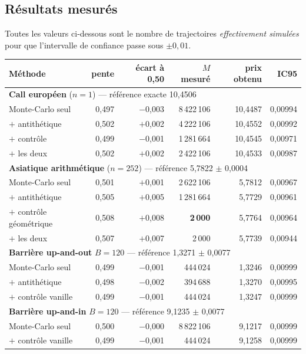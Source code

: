 \documentclass[11pt,a4paper]{article}
\begin{document}
\subsection{Résultats mesurés}

Toutes les valeurs ci-dessous sont le nombre de trajectoires \emph{effectivement
simulées} pour que l'intervalle de confiance passe sous $\pm 0{,}01$.

\begin{center}
\small
\begin{tabular}{lrrrrr}
\toprule
Méthode & pente & écart à 0,50 & $M$ mesuré & prix obtenu & IC95 \\
\midrule
\multicolumn{6}{l}{\textbf{Call européen} ($n = 1$) --- référence exacte 10,4506}\\
Monte-Carlo seul        & 0,497 & $-$0,003 & 8\,422\,106 & 10,4487 & 0,00994 \\
$+$ antithétique        & 0,502 & $+$0,002 & 4\,222\,106 & 10,4552 & 0,00992 \\
$+$ contrôle            & 0,499 & $-$0,001 & 1\,281\,664 & 10,4545 & 0,00971 \\
$+$ les deux            & 0,502 & $+$0,002 & 2\,422\,106 & 10,4533 & 0,00987 \\
\midrule
\multicolumn{6}{l}{\textbf{Asiatique arithmétique} ($n = 252$) --- référence 5,7822 $\pm$ 0,0004}\\
Monte-Carlo seul        & 0,501 & $+$0,001 & 2\,622\,106 & 5,7812 & 0,00967 \\
$+$ antithétique        & 0,505 & $+$0,005 & 1\,281\,664 & 5,7729 & 0,00961 \\
$+$ contrôle géométrique & 0,508 & $+$0,008 & \textbf{2\,000} & 5,7764 & 0,00964 \\
$+$ les deux            & 0,507 & $+$0,007 & 2\,000 & 5,7739 & 0,00944 \\
\midrule
\multicolumn{6}{l}{\textbf{Barrière up-and-out} $B = 120$ --- référence 1,3271 $\pm$ 0,0077}\\
Monte-Carlo seul        & 0,499 & $-$0,001 & 444\,024 & 1,3246 & 0,00999 \\
$+$ antithétique        & 0,498 & $-$0,002 & 394\,688 & 1,3270 & 0,00995 \\
$+$ contrôle vanille    & 0,499 & $-$0,001 & 444\,024 & 1,3247 & 0,00999 \\
\midrule
\multicolumn{6}{l}{\textbf{Barrière up-and-in} $B = 120$ --- référence 9,1235 $\pm$ 0,0077}\\
Monte-Carlo seul        & 0,500 & $-$0,000 & 8\,822\,106 & 9,1217 & 0,00999 \\
$+$ contrôle vanille    & 0,499 & $-$0,001 & 444\,024 & 9,1258 & 0,00999 \\
\bottomrule
\end{tabular}
\end{center}
\end{document}
